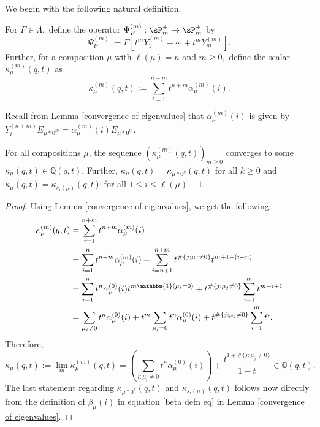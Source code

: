 We begin with the following natural definition. 

\begin{defi}\label{defn 13}
    For $F \in \Lambda,$ define the operator $\Psi_{F}^{(m)}: \sP_{m}^{+} \rightarrow \sP_{m}^{+}$ by
    \begin{equation}
    \Psi_{F}^{(m)} := F[t^m Y_1^{(m)}+ \cdots + t^m Y_m^{(m)}].
    \end{equation}
    Further, for a composition $\mu$ with $\ell(\mu) = n$ and $m \geq 0,$ define the scalar $\kappa_{\mu}^{(m)}(q,t)$ as 
    \begin{equation}
        \kappa_{\mu}^{(m)}(q,t):= \sum_{i=1}^{n+m} t^{n+m} \alpha_{\mu}^{(m)}(i).
    \end{equation}
    
\end{defi}

 Recall from Lemma \ref{convergence of eigenvalues} that $\alpha_{\mu}^{(m)}(i)$ is given by $Y_{i}^{(n+m)}E_{\mu*0^m} = \alpha_{\mu}^{(m)}(i)E_{\mu*0^m}$.

    
\begin{lemm}\label{kappas converge}
    For all compositions $\mu$, the sequence $(\kappa_{\mu}^{(m)}(q,t))_{m\geq 0}$ converges to some $\kappa_{\mu}(q,t) \in \mathbb{Q}(q,t).$ Further, $\kappa_{\mu}(q,t) = \kappa_{\mu*0^k}(q,t)$ for all $k \geq 0$ and $\kappa_{\mu}(q,t) = \kappa_{s_i(\mu)}(q,t) $ for all $1\leq i \leq \ell(\mu) -1$.
\end{lemm}

\begin{proof}
    Using Lemma \ref{convergence of eigenvalues}, we get the following:
\begin{align*}
    \kappa_{\mu}^{(m)}(q,t) &= \sum_{i=1}^{n+m}t^{n+m}\alpha_{\mu}^{(m)}(i) \\
    &= \sum_{i=1}^{n}t^{n+m}\alpha_{\mu}^{(m)}(i) + \sum_{i=n+1}^{n+m} t^{\#\{j:\mu_j \neq 0\}}t^{m+1-(i-n)} \\
    &= \sum_{i=1}^{n}t^n \alpha_{\mu}^{(0)}(i) t^{m \mathbbm{1}(\mu_i=0)} + t^{\#\{j:\mu_j \neq 0\}}\sum_{i=1}^{m}t^{m-i+1} \\
    &= \sum_{\mu_i \neq 0}t^n \alpha_{\mu}^{(0)}(i) + t^m \sum_{\mu_i =0} t^n \alpha_{\mu}^{(0)}(i) + t^{\#\{j:\mu_j \neq 0\}}\sum_{i=1}^{m}t^{i}.
\end{align*}
Therefore, 
\begin{equation}\label{kappa defn eq}
\kappa_{\mu}(q,t) := \lim_{m} \kappa_{\mu}^{(m)}(q,t) = \left( \sum_{i:\mu_i \neq 0}t^n \alpha_{\mu}^{(0)}(i) \right) + \frac{t^{1+\#\{j:\mu_j \neq 0\}}}{1-t} \in \mathbb{Q}(q,t).
\end{equation}
The last statement regarding $\kappa_{\mu*0^k}(q,t)$ and $\kappa_{s_i(\mu)}(q,t)$ follows now directly from the definition of $\beta_{\mu}(i)$ in equation \eqref{beta defn eq} in Lemma \ref{convergence of eigenvalues}.
\end{proof}


